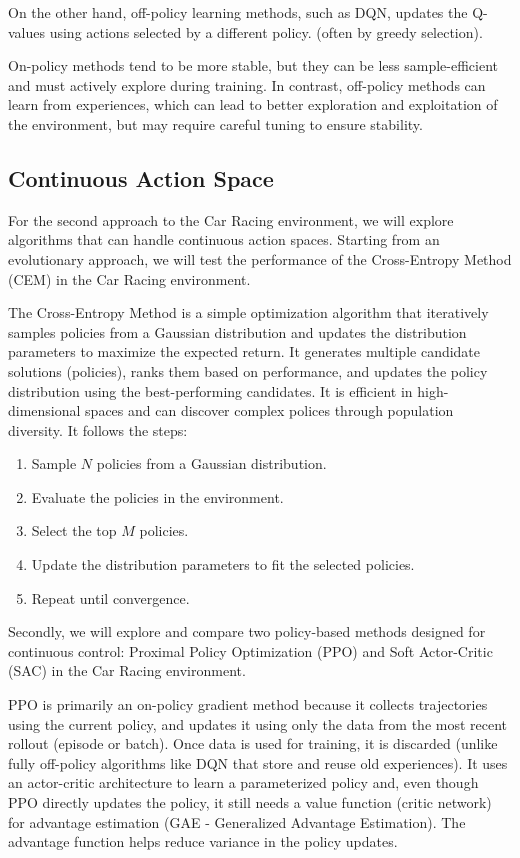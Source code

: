 \documentclass[../CSC_52081_EP.tex]{subfiles}
\begin{document}
    On the other hand, off-policy learning methods, such as DQN, updates the Q-values using actions selected by a different policy. (often by greedy selection).

    On-policy methods tend to be more stable, but they can be less sample-efficient and must actively explore during training. In contrast, off-policy methods can learn from experiences, which can lead to better exploration and exploitation of the environment, but may require careful tuning to ensure stability.

    \subsection{Continuous Action Space}

    For the second approach to the Car Racing environment, we will explore algorithms that can handle continuous action spaces.
    Starting from an evolutionary approach, we will test the performance of the Cross-Entropy Method (CEM) in the Car Racing environment.

    The Cross-Entropy Method is a simple optimization algorithm that iteratively samples policies from a Gaussian distribution and updates the distribution parameters to maximize the expected return.
    It generates multiple candidate solutions (policies), ranks them based on performance, and updates the policy distribution using the best-performing candidates. It is efficient in high-dimensional spaces and can discover complex polices through population diversity. It follows the steps:
    
    \begin{enumerate}
        \item Sample $N$ policies from a Gaussian distribution.
        \item Evaluate the policies in the environment.
        \item Select the top $M$ policies.
        \item Update the distribution parameters to fit the selected policies.
        \item Repeat until convergence.
    \end{enumerate}


    Secondly, we will explore and compare two policy-based methods designed for continuous control: Proximal Policy Optimization (PPO) \cite{PPO} and Soft Actor-Critic (SAC) \cite{SAC} in the Car Racing environment.
    
    PPO is primarily an on-policy gradient method because it collects trajectories using the current policy, and updates it using only the data from the most recent rollout (episode or batch). Once data is used for training, it is discarded (unlike fully off-policy algorithms like DQN that store and reuse old experiences). It uses an actor-critic architecture to learn a parameterized policy and, even though PPO directly updates the policy, it still needs a value function (critic network) for advantage estimation (GAE - Generalized Advantage Estimation).
    The advantage function helps reduce variance in the policy updates.
    
\end{document}

